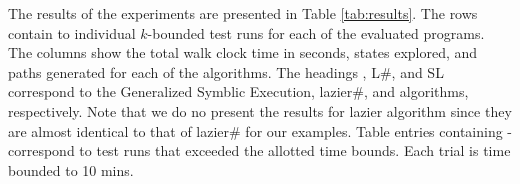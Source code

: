 \begin{table*} [t]
  \centering
  \caption{Comparing the efficiency of the summary heap appraoch to GSE and Lazier\# algorithms.}
  \label{tab:results}
\end{table*}


The results of the experiments are presented in Table
\ref{tab:results}. The rows contain to individual $k$-bounded test
runs for each of the evaluated programs. The columns show the total
walk clock time in seconds, states explored, and paths generated for
each of the algorithms. The headings \gsetxt{}, L\#, and SL correspond
to the Generalized Symblic Execution, lazier\#, and \symtxt{}
algorithms, respectively. Note that we do no present the results for
lazier algorithm since they are almost identical to that of lazier\#
for our examples. Table entries containing - correspond to test runs
that exceeded the allotted time bounds. Each trial is time bounded to
10 mins.

